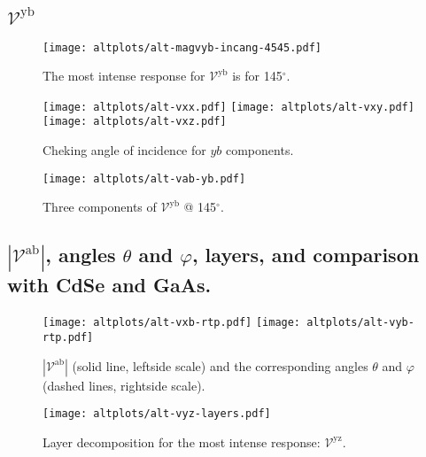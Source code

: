 \documentclass{article}
\let\Oldsubsection\subsection
\renewcommand{\subsection}{\FloatBarrier\Oldsubsection}
\begin{document}
\subsection{$\mathcal{V}^{\mathrm{yb}}$}
\begin{figure}[h]
    \centering
    \texttt{[image: altplots/alt-magvyb-incang-4545.pdf]}
    \caption{The most intense response for $\mathcal{V}^{\mathrm{yb}} $ is for 
    145$^{\circ}$.}
    \label{fig:alt-magvybincang1}
\end{figure}
\begin{figure}[ht]
    \centering
    \texttt{[image: altplots/alt-vxx.pdf]}
    \texttt{[image: altplots/alt-vxy.pdf]}\\
    \texttt{[image: altplots/alt-vxz.pdf]}
    \caption{Cheking angle of incidence for $yb$ components.}
    \label{fig:alt-ybangcomp}
\end{figure}
\begin{figure}[ht]
    \centering
    \texttt{[image: altplots/alt-vab-yb.pdf]}
    \caption{Three components of $\mathcal{V}^{\mathrm{yb}} $ @ 145$^{\circ}$.}
    \label{fig:alt-vyb1}
\end{figure}

\subsection{$|\mathcal{V}^{\mathrm{ab}}|$, angles
$\theta$ and $\varphi$, layers, and comparison with CdSe and GaAs.}
\begin{figure}[ht]
    \centering
    \texttt{[image: altplots/alt-vxb-rtp.pdf]}
    \texttt{[image: altplots/alt-vyb-rtp.pdf]}
    \caption{$|\mathcal{V}^{\mathrm{ab}}|$ (solid line, leftside scale) and the
    corresponding angles $\theta$ and $\varphi$ (dashed lines, rightside scale).}
    \label{fig:alt-rtp}
\end{figure}

\begin{figure}[ht]
    \centering
    \texttt{[image: altplots/alt-vyz-layers.pdf]}
    \caption{Layer decomposition for the most intense response:
    $\mathcal{V}^{\mathrm{yz}}$.}
    \label{fig:alt-lay}
\end{figure}
\end{document}
